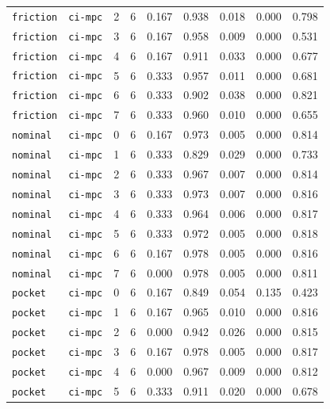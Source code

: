 \documentclass{article}
\begin{document}
\begin{center}
\begin{tabular}{lllcccccc}
\texttt{friction} & \texttt{ci-mpc} & 2 & 6 & 0.167 & 0.938 & 0.018 & 0.000 & 0.798 \\
\texttt{friction} & \texttt{ci-mpc} & 3 & 6 & 0.167 & 0.958 & 0.009 & 0.000 & 0.531 \\
\texttt{friction} & \texttt{ci-mpc} & 4 & 6 & 0.167 & 0.911 & 0.033 & 0.000 & 0.677 \\
\texttt{friction} & \texttt{ci-mpc} & 5 & 6 & 0.333 & 0.957 & 0.011 & 0.000 & 0.681 \\
\texttt{friction} & \texttt{ci-mpc} & 6 & 6 & 0.333 & 0.902 & 0.038 & 0.000 & 0.821 \\
\texttt{friction} & \texttt{ci-mpc} & 7 & 6 & 0.333 & 0.960 & 0.010 & 0.000 & 0.655 \\
\texttt{nominal} & \texttt{ci-mpc} & 0 & 6 & 0.167 & 0.973 & 0.005 & 0.000 & 0.814 \\
\texttt{nominal} & \texttt{ci-mpc} & 1 & 6 & 0.333 & 0.829 & 0.029 & 0.000 & 0.733 \\
\texttt{nominal} & \texttt{ci-mpc} & 2 & 6 & 0.333 & 0.967 & 0.007 & 0.000 & 0.814 \\
\texttt{nominal} & \texttt{ci-mpc} & 3 & 6 & 0.333 & 0.973 & 0.007 & 0.000 & 0.816 \\
\texttt{nominal} & \texttt{ci-mpc} & 4 & 6 & 0.333 & 0.964 & 0.006 & 0.000 & 0.817 \\
\texttt{nominal} & \texttt{ci-mpc} & 5 & 6 & 0.333 & 0.972 & 0.005 & 0.000 & 0.818 \\
\texttt{nominal} & \texttt{ci-mpc} & 6 & 6 & 0.167 & 0.978 & 0.005 & 0.000 & 0.816 \\
\texttt{nominal} & \texttt{ci-mpc} & 7 & 6 & 0.000 & 0.978 & 0.005 & 0.000 & 0.811 \\
\texttt{pocket} & \texttt{ci-mpc} & 0 & 6 & 0.167 & 0.849 & 0.054 & 0.135 & 0.423 \\
\texttt{pocket} & \texttt{ci-mpc} & 1 & 6 & 0.167 & 0.965 & 0.010 & 0.000 & 0.816 \\
\texttt{pocket} & \texttt{ci-mpc} & 2 & 6 & 0.000 & 0.942 & 0.026 & 0.000 & 0.815 \\
\texttt{pocket} & \texttt{ci-mpc} & 3 & 6 & 0.167 & 0.978 & 0.005 & 0.000 & 0.817 \\
\texttt{pocket} & \texttt{ci-mpc} & 4 & 6 & 0.000 & 0.967 & 0.009 & 0.000 & 0.812 \\
\texttt{pocket} & \texttt{ci-mpc} & 5 & 6 & 0.333 & 0.911 & 0.020 & 0.000 & 0.678 \\
\bottomrule
\end{tabular}
\end{center}
\end{document}
